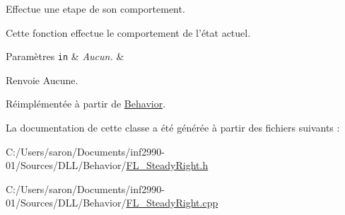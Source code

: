 Effectue une etape de son comportement. 

Cette fonction effectue le comportement de l'état actuel.


\begin{DoxyParams}[1]{Paramètres}
\mbox{\tt in}  & {\em Aucun.} & \\
\hline
\end{DoxyParams}
\begin{DoxyReturn}{Renvoie}
Aucune. 
\end{DoxyReturn}


Réimplémentée à partir de \hyperlink{group__inf2990_gac22f205bc85075ff707ad1f695c18439}{Behavior}.



La documentation de cette classe a été générée à partir des fichiers suivants \-:\begin{DoxyCompactItemize}
\item 
C\-:/\-Users/saron/\-Documents/inf2990-\/01/\-Sources/\-D\-L\-L/\-Behavior/\hyperlink{_f_l___steady_right_8h}{F\-L\-\_\-\-Steady\-Right.\-h}\item 
C\-:/\-Users/saron/\-Documents/inf2990-\/01/\-Sources/\-D\-L\-L/\-Behavior/\hyperlink{_f_l___steady_right_8cpp}{F\-L\-\_\-\-Steady\-Right.\-cpp}\end{DoxyCompactItemize}
